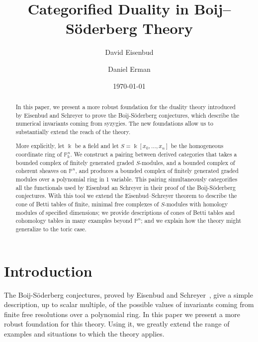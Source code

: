 \documentclass[12pt]{amsart}
\title{Categorified Duality in Boij--S\"oderberg Theory}
\author{David Eisenbud}
\author{Daniel Erman}\thanks{First author supported by an NSF and second author supported by an NSF and by Simons \dots}
\date{\today}
\theoremstyle{definition}
\theoremstyle{remark}
\newcommand{\kk}{\Bbbk}
\newcommand{\PP}{\mathbb{P}}
\renewcommand{\P}{{\mathbb P}}
\begin{document}
\maketitle



\begin{abstract} In this paper, we present a more robust foundation for the duality theory introduced by Eisenbud and Schreyer to prove the Boij-S\"oderberg conjectures, which describe the numerical invariants coming from syzygies. The new foundations allow us to substantially extend the reach of the theory.

More explicitly, let $\kk$ be a field and let $S = \kk[x_{0}, \dots,x_{n}]$ be the homogeneous coordinate ring of $\PP^{n}_{\kk}$.
We construct a pairing between derived categories that takes a bounded complex of
finitely generated graded $S$-modules,  and a bounded complex of coherent sheaves on $\P^{n}$, and produces a bounded complex of finitely generated graded modules over a polynomial ring in 1 variable. This pairing simultaneously categorifies all the functionals used by Eisenbud an Schreyer in their proof of the Boij-S\"oderberg conjectures. With this tool we extend the Eisenbud--Schreyer theorem to describe the cone of Betti tables of finite, minimal free complexes of $S$-modules with homology modules of specified dimensions;  we provide descriptions of cones of Betti tables and cohomology tables in many examples beyond $\PP^n$; and we explain how the theory might generalize to the toric case.
\end{abstract}


\section*{Introduction}
The Boij-S\"oderberg conjectures, proved by Eisenbud and Schreyer~\cite{eis-schrey1}, give a simple description, up to scalar multiple, of the possible values of invariants coming from finite free resolutions over a polynomial ring. In this paper we present a more robust foundation for this theory. Using it, we greatly extend the range of examples and situations to which the theory applies.
\end{document}
